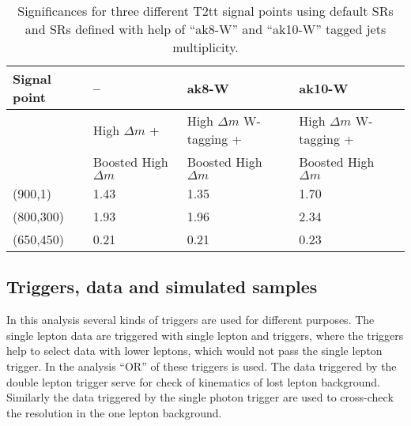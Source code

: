 \begin{table}[h]
\begin{center}
\begin{tabular}{|l|l|l|l|}
\hline
Signal point             & --      & ak8-W & ak10-W \\
\hline
                       & High $\Delta m$ +           &  High $\Delta m$ W-tagging +  &   High $\Delta m$ W-tagging +  \\
                       &  Boosted High $\Delta m$    & Boosted High $\Delta m$       &   Boosted High $\Delta m$  \\
\hline
\hline
(900,1) &     1.43 & 1.35 & 1.70  \\
\hline
(800,300) &   1.93 & 1.96 & 2.34  \\
\hline
(650,450) &   0.21 & 0.21 & 0.23  \\
\hline
\end{tabular}
\caption[Table caption text]{ Significances for three different T2tt signal points using default SRs and SRs defined with help of ``ak8-W'' and ``ak10-W'' tagged jets multiplicity. }
\label{tab:taggingResults}
\end{center}
\end{table}




\subsection{Triggers, data and simulated samples~\label{sec:trigger}}

In this analysis several kinds of triggers are used for different purposes. The single lepton data are triggered with single lepton and \MET triggers, where the \MET triggers help to select data with lower \pt leptons, which would not pass the single lepton trigger. In the analysis ``OR'' of these triggers is used. The data triggered by the double lepton trigger serve for check of kinematics of lost lepton background. Similarly the data triggered by the single photon trigger are used to cross-check the \MET resolution in  the one lepton background.


